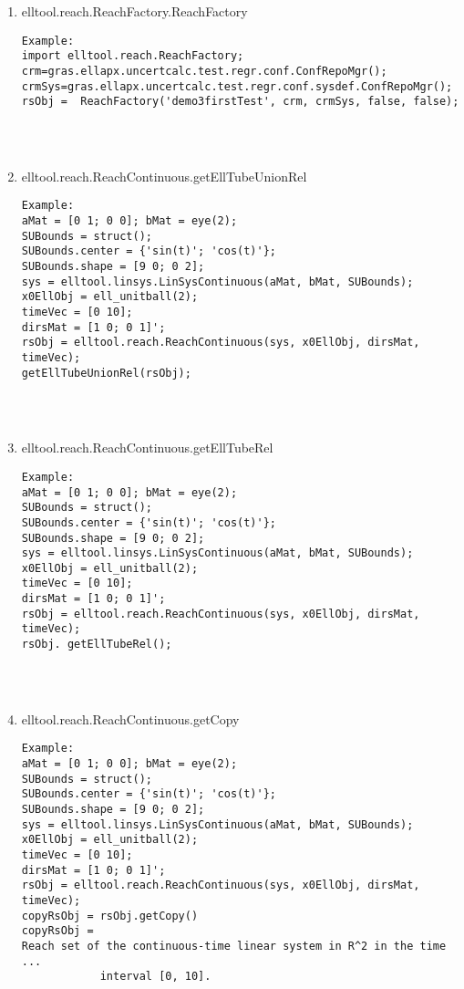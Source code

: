 \begin{enumerate}
\begin{lstlisting}
\end{lstlisting}
\fontfamily{\familydefault}
\selectfont
\item {elltool.reach.ReachFactory.ReachFactory}
\selectfont
\begin{lstlisting}
Example:
import elltool.reach.ReachFactory;
crm=gras.ellapx.uncertcalc.test.regr.conf.ConfRepoMgr();
crmSys=gras.ellapx.uncertcalc.test.regr.conf.sysdef.ConfRepoMgr();
rsObj =  ReachFactory('demo3firstTest', crm, crmSys, false, false);




\end{lstlisting}
\fontfamily{\familydefault}
\selectfont
\item {elltool.reach.ReachContinuous.getEllTubeUnionRel}
\selectfont
\begin{lstlisting}
Example:
aMat = [0 1; 0 0]; bMat = eye(2);
SUBounds = struct();
SUBounds.center = {'sin(t)'; 'cos(t)'};
SUBounds.shape = [9 0; 0 2];
sys = elltool.linsys.LinSysContinuous(aMat, bMat, SUBounds);
x0EllObj = ell_unitball(2);
timeVec = [0 10];
dirsMat = [1 0; 0 1]';
rsObj = elltool.reach.ReachContinuous(sys, x0EllObj, dirsMat, timeVec);
getEllTubeUnionRel(rsObj);




\end{lstlisting}
\fontfamily{\familydefault}
\selectfont
\item {elltool.reach.ReachContinuous.getEllTubeRel}
\selectfont
\begin{lstlisting}
Example:
aMat = [0 1; 0 0]; bMat = eye(2);
SUBounds = struct();
SUBounds.center = {'sin(t)'; 'cos(t)'};
SUBounds.shape = [9 0; 0 2];
sys = elltool.linsys.LinSysContinuous(aMat, bMat, SUBounds);
x0EllObj = ell_unitball(2);
timeVec = [0 10];
dirsMat = [1 0; 0 1]';
rsObj = elltool.reach.ReachContinuous(sys, x0EllObj, dirsMat, timeVec);
rsObj. getEllTubeRel();




\end{lstlisting}
\fontfamily{\familydefault}
\selectfont
\item {elltool.reach.ReachContinuous.getCopy}
\selectfont
\begin{lstlisting}
Example:
aMat = [0 1; 0 0]; bMat = eye(2);
SUBounds = struct();
SUBounds.center = {'sin(t)'; 'cos(t)'};
SUBounds.shape = [9 0; 0 2];
sys = elltool.linsys.LinSysContinuous(aMat, bMat, SUBounds);
x0EllObj = ell_unitball(2);
timeVec = [0 10];
dirsMat = [1 0; 0 1]';
rsObj = elltool.reach.ReachContinuous(sys, x0EllObj, dirsMat, timeVec);
copyRsObj = rsObj.getCopy()
copyRsObj =
Reach set of the continuous-time linear system in R^2 in the time ...
            interval [0, 10].


\end{lstlisting}
\end{enumerate}
